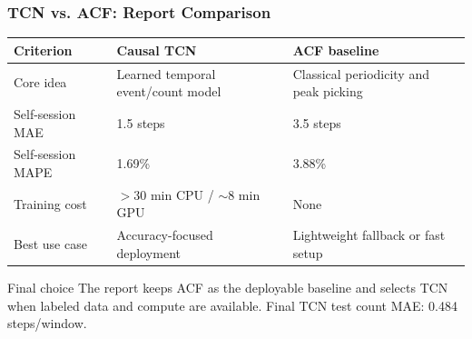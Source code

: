 \begin{frame}
	\frametitle{TCN vs. ACF: Report Comparison}
	\scriptsize
	\begin{table}
		\centering
		\begin{tabular}{p{}p{}p{}}
			\toprule
			Criterion & Causal TCN & ACF baseline \\
			\midrule
			Core idea & Learned temporal event/count model & Classical periodicity and peak picking \\
			Self-session MAE & 1.5 steps & 3.5 steps \\
			Self-session MAPE & 1.69\% & 3.88\% \\
			Training cost & $>$30 min CPU / $\sim$8 min GPU & None \\
			Best use case & Accuracy-focused deployment & Lightweight fallback or fast setup \\
			\bottomrule
		\end{tabular}
	\end{table}

	\begin{block}{Final choice}
		The report keeps ACF as the deployable baseline and selects TCN when labeled data and compute are available. Final TCN test count MAE: 0.484 steps/window.
	\end{block}
\end{frame}

